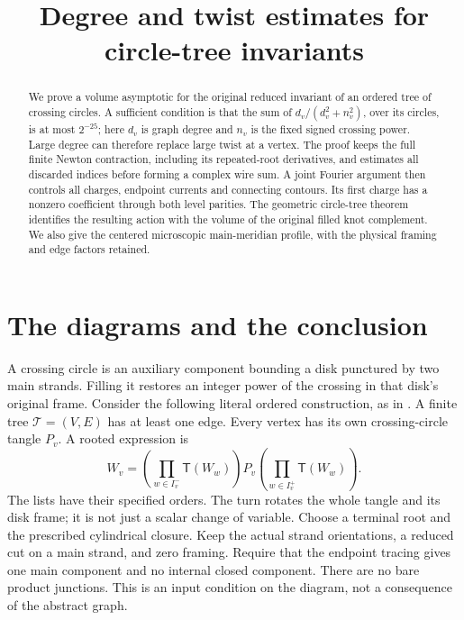 \documentclass[11pt]{article}
\title{Degree and twist estimates for circle-tree invariants}
\author{}\date{}
\numberwithin{equation}{section}
\theoremstyle{definition}\newtheorem{definition}[theorem]{Definition}
\theoremstyle{remark}\newtheorem{remark}[theorem]{Remark}
\newcommand{\Turn}{\mathsf T}
\begin{document}
\maketitle

\begin{abstract}
We prove a volume asymptotic for the original reduced invariant of an
ordered tree of crossing circles. A sufficient condition is that the sum
of \(d_v/(d_v^2+n_v^2)\), over its circles, is at most \(2^{-25}\);
here \(d_v\) is graph degree and \(n_v\) is the fixed signed crossing
power. Large degree can therefore replace large twist at a vertex.
The proof keeps the full finite Newton contraction, including its
repeated-root derivatives, and estimates all discarded indices before
forming a complex wire sum. A joint Fourier argument then controls all
charges, endpoint currents and connecting contours. Its first charge
has a nonzero coefficient through both level parities. The geometric
circle-tree theorem identifies the resulting action with the volume
of the original filled knot complement. We also give the centered
microscopic main-meridian profile, with the physical framing and
edge factors retained.
\end{abstract}

\section{The diagrams and the conclusion}\label{cta:intro}

A crossing circle is an auxiliary component bounding a disk punctured
by two main strands. Filling it restores an integer power of the
crossing in that disk's original frame. Consider the following literal
ordered construction, as in \cite[Section~1]{Geometry}. A finite tree
\(\mathcal T=(V,E)\) has at least one edge. Every vertex has its own
crossing-circle tangle \(P_v\). A rooted expression is
\begin{equation}\label{cta:word}
 W_v=\left(\prod_{w\in I_v^-}\Turn(W_w)\right)P_v
             \left(\prod_{w\in I_v^+}\Turn(W_w)\right).
\end{equation}
The lists have their specified orders. The turn rotates the whole
tangle and its disk frame; it is not just a scalar change of variable.
Choose a terminal root and the prescribed cylindrical closure. Keep
the actual strand orientations, a reduced cut on a main strand, and
zero framing. Require that the endpoint tracing gives one main
component and no internal closed component. There are no bare product
junctions. This is an input condition on the diagram, not a consequence
of the abstract graph.
\end{document}
